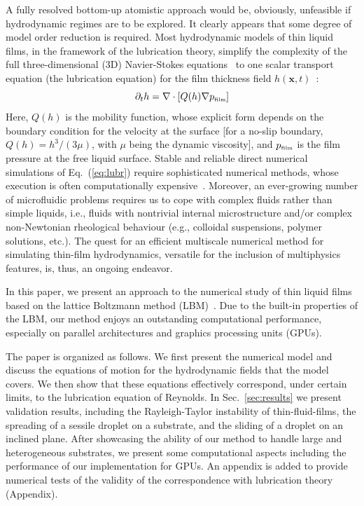A fully resolved bottom-up atomistic approach would be, obviously, unfeasible if hydrodynamic regimes are to be explored. 
It clearly appears that some degree of model order reduction is required. 
Most hydrodynamic models of thin liquid films, in the framework of the lubrication theory, simplify the complexity of the full three-dimensional (3D) Navier-Stokes equations~\cite{claude-louis-marie-henriMemoireLoisMouvement1827, stokesSteadyMotionIncompressible1848} to one scalar transport equation (the lubrication equation) for the film thickness field $h(\mathbf{x},t)$~\cite{reynoldsTheoryLubricationIts1886,oronLongscaleEvolutionThin1997,crasterDynamicsStabilityThin2009,mitlinDewettingSolidSurface1993}:
\begin{equation}\label{eq:lubr}
    \partial_t h = \nabla \cdot \left[Q(h)\nabla p_{\mbox{\tiny{film}}}\right]
\end{equation}
Here, $Q(h)$ is the mobility function, whose explicit form depends on the boundary condition for the velocity at the surface [for a no-slip boundary, $Q(h) = h^3/(3 \mu)$, with $\mu$ being the dynamic viscosity], and $p_{\mbox{\tiny{film}}}$ is the film pressure at the free liquid surface.
Stable and reliable direct numerical simulations of Eq.~(\ref{eq:lubr}) require sophisticated numerical methods, whose execution is often computationally expensive~\cite{beckerComplexDewettingScenarios2003}.
Moreover, an ever-growing number of microfluidic problems requires us to cope with complex fluids rather than simple liquids, i.e., fluids with nontrivial internal microstructure and/or complex non-Newtonian rheological behaviour (e.g., colloidal suspensions, polymer solutions, etc.). 
The quest for an efficient multiscale numerical method for simulating thin-film hydrodynamics, versatile for the inclusion of multiphysics features, is, thus, an ongoing endeavor. 

In this paper, we present an approach to the numerical study of thin liquid films based on the lattice Boltzmann method (LBM)~\cite{succiLatticeBoltzmannEquation2001}. 
Due to the built-in properties of the LBM, our method enjoys an outstanding computational performance, especially on parallel architectures and graphics processing units (GPUs). 

The paper is organized as follows. 
We first present the numerical model and discuss the equations of motion for the hydrodynamic fields that the model covers. 
We then show that these equations effectively correspond, under certain limits, to the lubrication equation of Reynolds.
In Sec.~\ref{sec:results} we present validation results, including the Rayleigh-Taylor instability of thin-fluid-films, the spreading of a sessile droplet on a substrate, and the sliding of a droplet on an inclined plane. 
After showcasing the ability of our method to handle large and heterogeneous substrates, we present some computational aspects including the performance of our implementation for GPUs. 
An appendix is added to provide numerical tests of the validity of the correspondence with lubrication theory (Appendix).

